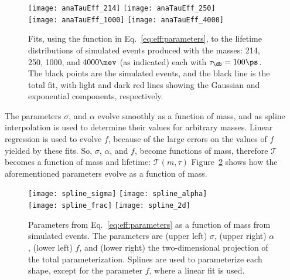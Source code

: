 \begin{figure}
  \begin{center}
    \texttt{[image: anaTauEff\_214]}
    \texttt{[image: anaTauEff\_250]}\\
    \texttt{[image: anaTauEff\_1000]}
    \texttt{[image: anaTauEff\_4000]}
    \caption{\small
      Fits, using the function in Eq.~\protect\ref{eq:eff:parameters},
      to the lifetime distributions of simulated events produced with the masses:
      214, 250, 1000, and $4000\mev$ (as indicated)
      each with $\tau_\db=100\ps$.
      The black points are the simulated events, and the black line is the total fit, with light
      and dark red lines showing the Gaussian and exponential components, respectively.
    }
    \label{fig:eff:fits}
  \end{center}
\end{figure}

The parameters $\sigma$, and $\alpha$ evolve smoothly as a function of mass, and as
spline interpolation is used to determine their values for arbitrary masses.
Linear regression is used to evolve $f$, because of the large errors on the values of $f$ yielded
by these fits.
So, $\sigma$, $\alpha$, and $f$, become functions of mass, therefore $\mathcal{T}$ becomes a
function of mass and lifetime: $\mathcal{T}(m,\tau)$
Figure~\ref{fig:eff:spline} shows how the aforementioned parameters evolve as a function of mass.

\begin{figure}
  \begin{center}
    \texttt{[image: spline\_sigma]}
    \texttt{[image: spline\_alpha]}\\
    \texttt{[image: spline\_frac]}
    \texttt{[image: spline\_2d]}
    \caption[Parameterization of lifetime as a function of mass]
    {
      Parameters from Eq.~\protect\ref{eq:eff:parameters} as a function of mass from
      simulated events.
      The parameters are
      (upper left) $\sigma$,
      (upper right) $\alpha$,
      (lower left) $f$, and
      (lower right) the two-dimensional projection of the total parameterization.
      Splines are used to parameterize each shape, except for the parameter $f$, where a
      linear fit is used.
    }
    \label{fig:eff:spline}
  \end{center}
\end{figure}


